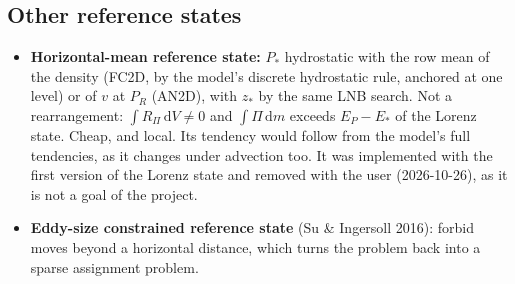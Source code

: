 \documentclass[11pt,a4paper]{article}
\newcommand{\zs}{z_{*}}
\begin{document}
\subsection{Other reference states}
\begin{itemize}
  \item \textbf{Horizontal-mean reference state:} $P_*$ hydrostatic with the row mean of the density (FC2D, by the model's
        discrete hydrostatic rule, anchored at one level) or of $v$ at $P_R$ (AN2D), with $\zs$ by the same LNB search. Not a
        rearrangement: $\int R_\Pi\,\mathrm{d}V\ne0$ and $\int\Pi\,\mathrm{d}m$ exceeds $E_P-E_*$ of the Lorenz state. Cheap, and
        local. Its tendency would follow from the model's full tendencies, as it changes under advection too. It was
        implemented with the first version of the Lorenz state and removed with the user (2026-10-26), as it is not a goal
        of the project.
  \item \textbf{Eddy-size constrained reference state} (Su \& Ingersoll 2016): forbid moves beyond a horizontal distance, which
        turns the problem back into a sparse assignment problem.
\end{itemize}
\end{document}
